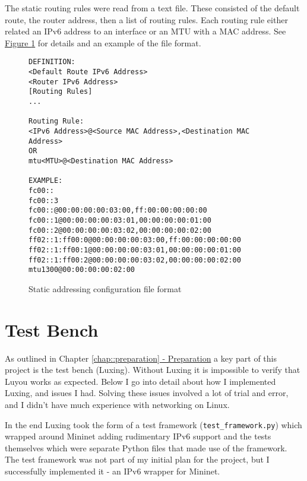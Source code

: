 \documentclass[12pt,a4paper,twoside,openany]{report}
\begin{document}
\bigskip

The static routing rules were read from a text file. These consisted of the default route, the router address, then a list of routing rules.  Each routing rule either related an IPv6 address to an interface or an MTU with a MAC address. See \hyperref[fig::config_file]{Figure }\ref{fig::config_file} for details and an example of the file format. 

\begin{figure}
\begin{varwidth}{\linewidth}
\begin{verbatim}
DEFINITION:
<Default Route IPv6 Address>
<Router IPv6 Address>
[Routing Rules]
...

Routing Rule:
<IPv6 Address>@<Source MAC Address>,<Destination MAC Address>
OR
mtu<MTU>@<Destination MAC Address>

EXAMPLE:
fc00::
fc00::3
fc00::@00:00:00:00:03:00,ff:00:00:00:00:00
fc00::1@00:00:00:00:03:01,00:00:00:00:01:00
fc00::2@00:00:00:00:03:02,00:00:00:00:02:00
ff02::1:ff00:0@00:00:00:00:03:00,ff:00:00:00:00:00
ff02::1:ff00:1@00:00:00:00:03:01,00:00:00:00:01:00
ff02::1:ff00:2@00:00:00:00:03:02,00:00:00:00:02:00
mtu1300@00:00:00:00:02:00
\end{verbatim}
\end{varwidth}
\caption{Static addressing configuration file format}
\label{fig::config_file}
\end{figure}

\section{Test Bench}

As outlined in Chapter \ref{chap::preparation}\hyperref[chap::preparation]{ - Preparation} a key part of this project is the test bench (Luxing). Without Luxing it is impossible to verify that Luyou works as expected.  Below I go into detail about how I implemented Luxing, and issues I had.  Solving these issues involved a lot of trial and error, and I didn't have much experience with networking on Linux.  

In the end Luxing took the form of a test framework (\verb!test_framework.py!) which wrapped around Mininet adding rudimentary IPv6 support and the tests themselves which were separate Python files that made use of the framework. The test framework was not part of my initial plan for the project, but I successfully implemented it - an IPv6 wrapper for Mininet.

\bigskip
\end{document}
